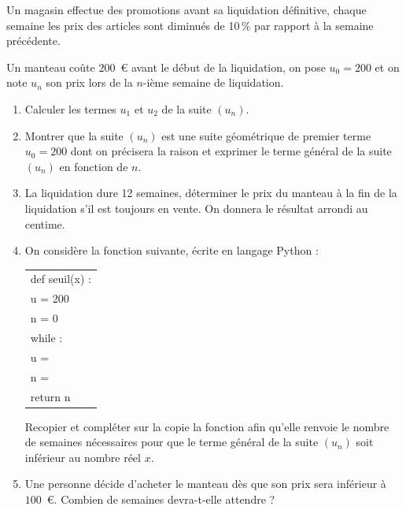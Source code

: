 \medskip

Un magasin effectue des promotions avant sa liquidation définitive, chaque semaine les prix des articles sont diminués  de 10\,\% par rapport à la semaine précédente. 

Un manteau coûte $200$~\euro{} avant le début de la liquidation, on pose $u_0=200$ et on note $u_n$ son prix lors de la $n$-ième semaine de liquidation.

\medskip

\begin{enumerate}
\item Calculer les termes $u_1$ et $u_2$ de la suite $(u_n)$.
\item Montrer que la suite $\left(u_n\right)$ est une suite géométrique de premier terme $u_0=200$ dont on précisera la raison et exprimer le terme général de la suite $\left(u_n\right)$ en fonction de $n$.
\item La liquidation dure 12 semaines, déterminer le prix du manteau à la fin de la liquidation s'il est toujours en vente. On donnera le résultat arrondi au centime.
\item On considère la fonction suivante, écrite en langage Python :

\begin{center}
\begin{tabular}[]{m{2.5cm}}
def seuil(x) :\\
\hspace{1.2em}u = 200\\
\hspace{1.2em}n = 0\\
 \hspace{1.2em}while \dotfill:\\
\hspace{2.5em}u =\dotfill\\
 \hspace{2.5em}n =\dotfill\\
\hspace{1.2em}return n\\
\end{tabular}
\end{center}

Recopier et compléter sur la copie la fonction afin qu'elle renvoie le nombre de semaines nécessaires pour que le terme général de la suite $\left(u_n\right)$ soit inférieur au nombre réel $x$.
\item Une personne décide d'acheter le manteau dès que son prix sera inférieur à $100$~\euro. Combien de semaines devra-t-elle attendre ?
\end{enumerate}

\vspace{0,5cm}
